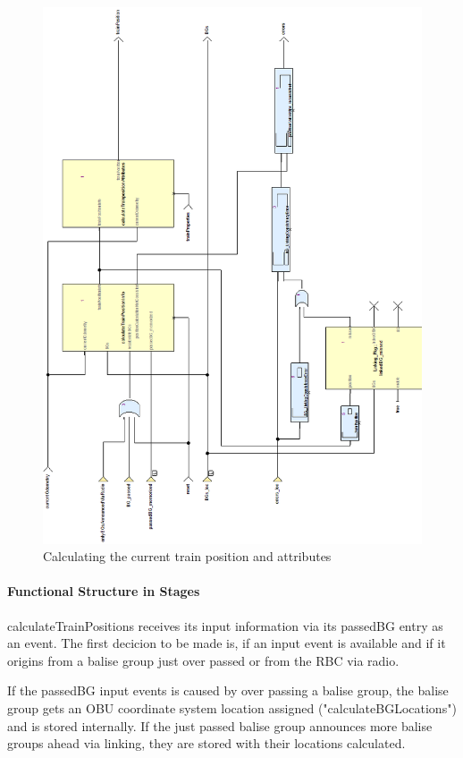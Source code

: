 \begin{figure}[!htb]
\centering
\includegraphics[scale=0.5]{../images/calculateTrainPosition_decorations.png}
\caption{Calculating the current train position and attributes}
\end{figure}

\clearpage

\paragraph{Functional Structure in Stages}
calculateTrainPositions receives its input information via its passedBG entry as an event. The first decicion to be made is, if an input event is available and if it origins from a balise group just over passed or from the RBC via radio. 

If the passedBG input events is caused by over passing a balise group, the balise group gets an OBU coordinate system location assigned ("calculateBGLocations") and is stored internally. If the just passed balise group announces more balise groups ahead via linking, they are stored with their locations calculated. 

